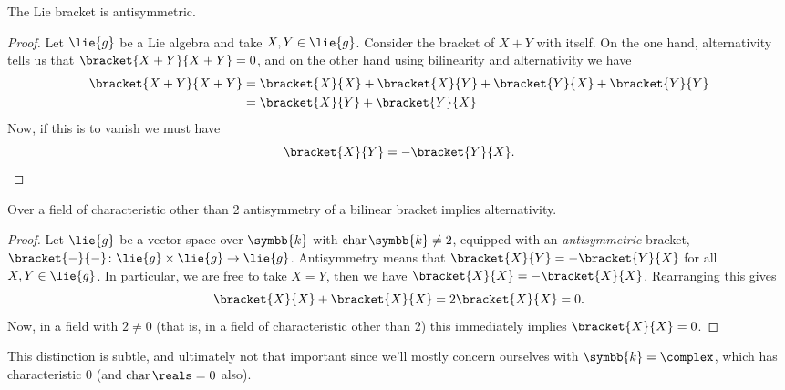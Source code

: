 \documentclass[fleqn]{NotesClass}
\renewcommand{\field}{\symbb{k}}
\DeclareMathOperator{\Char}{char}
\begin{document}
    \begin{lma}{}{}
        The Lie bracket is antisymmetric.
        \begin{proof}
            Let \(\lie{g}\) be a Lie algebra and take \(X, Y \in \lie{g}\).
            Consider the bracket of \(X + Y\) with itself.
            On the one hand, alternativity tells us that \(\bracket{X + Y}{X + Y} = 0\), and on the other hand using bilinearity and alternativity we have
            \begin{align}
                \bracket{X + Y}{X + Y} &= \bracket{X}{X} + \bracket{X}{Y} + \bracket{Y}{X} + \bracket{Y}{Y}\\
                &= \bracket{X}{Y} + \bracket{Y}{X}
            \end{align}
            Now, if this is to vanish we must have
            \begin{equation}
                \bracket{X}{Y} = -\bracket{Y}{X}. \qedhere
            \end{equation}
        \end{proof}
    \end{lma}
    
    \begin{lma}{}{}
        Over a field of characteristic other than 2 antisymmetry of a bilinear bracket implies alternativity.
        \begin{proof}
            Let \(\lie{g}\) be a vector space over \(\field\) with \(\Char \field \ne 2\), equipped with an \emph{antisymmetric} bracket, \(\bracket{-}{-} \colon \lie{g} \times \lie{g} \to \lie{g}\).
            Antisymmetry means that \(\bracket{X}{Y} = -\bracket{Y}{X}\) for all \(X, Y \in \lie{g}\).
            In particular, we are free to take \(X = Y\), then we have \(\bracket{X}{X} = -\bracket{X}{X}\).
            Rearranging this gives
            \begin{equation}
                \bracket{X}{X} + \bracket{X}{X} = 2 \bracket{X}{X} = 0.
            \end{equation}
            Now, in a field with \(2 \ne 0\) (that is, in a field of characteristic other than 2) this immediately implies \(\bracket{X}{X} = 0\).
        \end{proof}
    \end{lma}
    
    This distinction is subtle, and ultimately not that important since we'll mostly concern ourselves with \(\field = \complex\), which has characteristic 0 (and \(\Char \reals = 0\) also).
    
\end{document}
